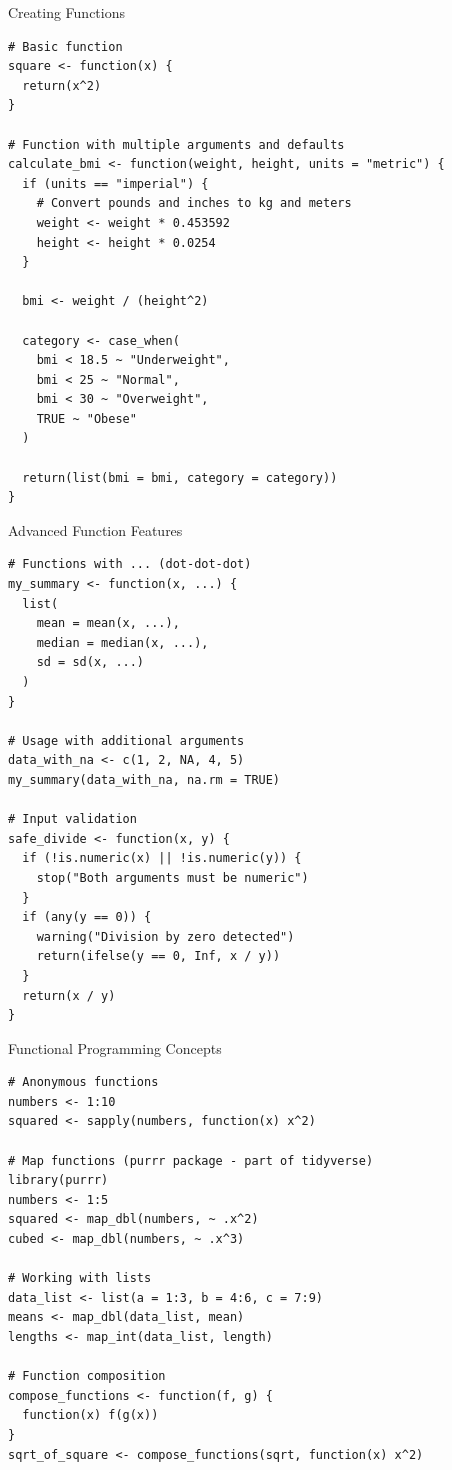 \documentclass[aspectratio=169]{beamer}
\begin{document}
\begin{frame}[fragile]{Creating Functions}
\begin{lstlisting}
# Basic function
square <- function(x) {
  return(x^2)
}

# Function with multiple arguments and defaults
calculate_bmi <- function(weight, height, units = "metric") {
  if (units == "imperial") {
    # Convert pounds and inches to kg and meters
    weight <- weight * 0.453592
    height <- height * 0.0254
  }

  bmi <- weight / (height^2)

  category <- case_when(
    bmi < 18.5 ~ "Underweight",
    bmi < 25 ~ "Normal",
    bmi < 30 ~ "Overweight",
    TRUE ~ "Obese"
  )

  return(list(bmi = bmi, category = category))
}
\end{lstlisting}
\end{frame}

\begin{frame}[fragile]{Advanced Function Features}
\begin{lstlisting}
# Functions with ... (dot-dot-dot)
my_summary <- function(x, ...) {
  list(
    mean = mean(x, ...),
    median = median(x, ...),
    sd = sd(x, ...)
  )
}

# Usage with additional arguments
data_with_na <- c(1, 2, NA, 4, 5)
my_summary(data_with_na, na.rm = TRUE)

# Input validation
safe_divide <- function(x, y) {
  if (!is.numeric(x) || !is.numeric(y)) {
    stop("Both arguments must be numeric")
  }
  if (any(y == 0)) {
    warning("Division by zero detected")
    return(ifelse(y == 0, Inf, x / y))
  }
  return(x / y)
}
\end{lstlisting}
\end{frame}

\begin{frame}[fragile]{Functional Programming Concepts}
\begin{lstlisting}
# Anonymous functions
numbers <- 1:10
squared <- sapply(numbers, function(x) x^2)

# Map functions (purrr package - part of tidyverse)
library(purrr)
numbers <- 1:5
squared <- map_dbl(numbers, ~ .x^2)
cubed <- map_dbl(numbers, ~ .x^3)

# Working with lists
data_list <- list(a = 1:3, b = 4:6, c = 7:9)
means <- map_dbl(data_list, mean)
lengths <- map_int(data_list, length)

# Function composition
compose_functions <- function(f, g) {
  function(x) f(g(x))
}
sqrt_of_square <- compose_functions(sqrt, function(x) x^2)
\end{lstlisting}
\end{frame}
\end{document}
